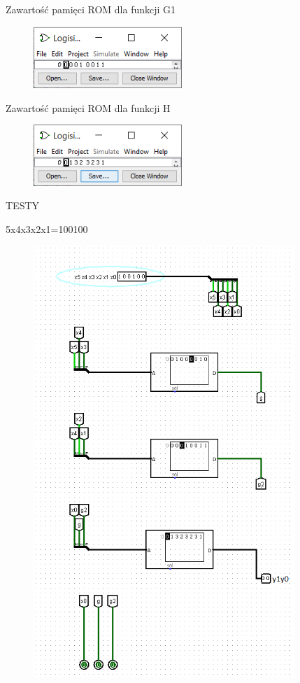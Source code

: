 \documentclass[]{article}
\begin{document}
Zawartość pamięci ROM dla funkcji G1
\begin{figure}[H]
	\centering
	\includegraphics[width=0.5\textwidth]{romG1.png}
\end{figure}
Zawartość pamięci ROM dla funkcji H
\begin{figure}[H]
	\centering
	\includegraphics[width=0.5\textwidth]{romH.png}
\end{figure}
\newpage
\begin{center}
    TESTY
\end{center}
5x4x3x2x1=100100
\begin{figure}[H]
	\centering
	\includegraphics[width=0.88\textwidth]{test3_100100.png}
\end{figure}
\end{document}
